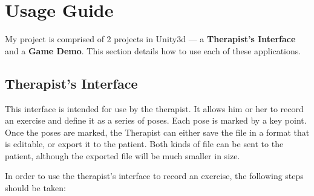 \documentclass{report}
\begin{document}
\section{Usage Guide}
My project is comprised of 2 projects in Unity3d --- a \textbf{Therapist's Interface} and a \textbf{Game Demo}. This section details how to use each of these applications.

\subsection{Therapist's Interface}
This interface is intended for use by the therapist. It allows him or her to record an exercise and define it as a series of poses. Each pose is marked by a key point. Once the poses are marked, the Therapist can either save the file in a format that is editable, or export it to the patient. Both kinds of file can be sent to the patient, although the exported file will be much smaller in size.

In order to use the therapist's interface to record an exercise, the following steps should be taken:
\end{document}
